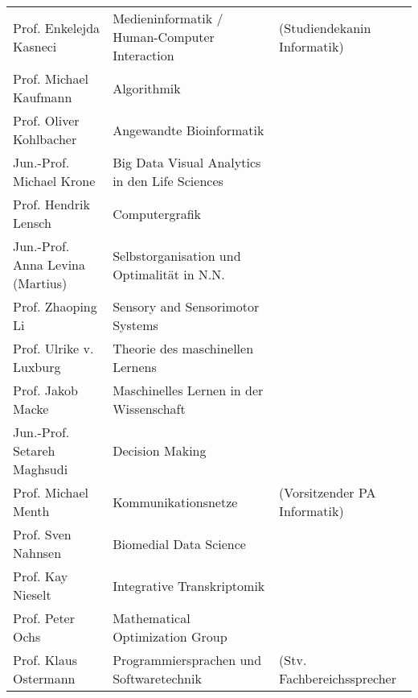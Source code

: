 \begin{tabular}{|lll|}
	Prof. Enkelejda Kasneci          & Medieninformatik / Human-Computer Interaction         & (Studiendekanin Informatik\footnotemark) \\
	Prof. Michael Kaufmann           & Algorithmik                                           &                                          \\
	Prof. Oliver Kohlbacher          & Angewandte Bioinformatik                              &                                          \\
	Jun.-Prof. Michael Krone         & Big Data Visual Analytics in den Life Sciences        &                                          \\
	Prof. Hendrik Lensch             & Computergrafik                                        &                                          \\
	Jun.-Prof. Anna Levina (Martius) & Selbstorganisation und Optimalität in N.N.            &                                          \\
	Prof. Zhaoping Li                & Sensory and Sensorimotor Systems                      &                                          \\
	Prof. Ulrike v. Luxburg          & Theorie des maschinellen Lernens                      &                                          \\
	Prof. Jakob Macke                & Maschinelles Lernen in der Wissenschaft               &                                          \\
	Jun.-Prof. Setareh Maghsudi      & Decision Making                                       &                                          \\
	Prof. Michael Menth              & Kommunikationsnetze                                   & (Vorsitzender PA Informatik)             \\
	Prof. Sven Nahnsen               & Biomedial Data Science                                &                                          \\
	Prof. Kay Nieselt                & Integrative Transkriptomik                            &                                          \\
	Prof. Peter Ochs								 & Mathematical Optimization Group											 &																					\\
	Prof. Klaus Ostermann            & Programmiersprachen und Softwaretechnik               & (Stv. Fachbereichssprecher               \\

\end{tabular}
